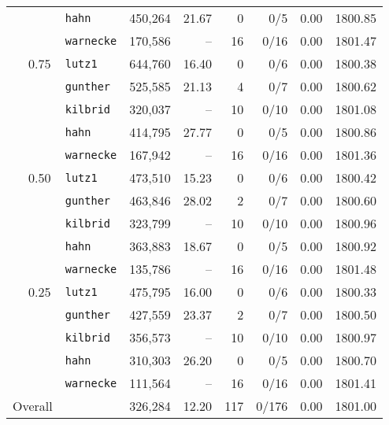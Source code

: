 \begin{table}[tpb]
\begin{tabular}{cclrrrrrr}
		&		& {\tt hahn}	& 450,264 & 21.67 & 0 & 0/5 & 0.00 & 1800.85 \\
		&		& {\tt warnecke}	& 170,586 & -- & 16 & 0/16 & 0.00 & 1801.47 \\
		& 0.75	& {\tt lutz1}	& 644,760 & 16.40 & 0 & 0/6 & 0.00 & 1800.38 \\
		&		& {\tt gunther}	& 525,585 & 21.13 & 4 & 0/7 & 0.00 & 1800.62 \\
		&		& {\tt kilbrid}	& 320,037 & -- & 10 & 0/10 & 0.00 & 1801.08 \\
		&		& {\tt hahn}	& 414,795 & 27.77 & 0 & 0/5 & 0.00 & 1800.86 \\
		&		& {\tt warnecke}	& 167,942 & -- & 16 & 0/16 & 0.00 & 1801.36 \\
		& 0.50	& {\tt lutz1}	& 473,510 & 15.23 & 0 & 0/6 & 0.00 & 1800.42 \\
		&		& {\tt gunther}	& 463,846 & 28.02 & 2 & 0/7 & 0.00 & 1800.60 \\
		&		& {\tt kilbrid}	& 323,799 & -- & 10 & 0/10 & 0.00 & 1800.96 \\
		&		& {\tt hahn}	& 363,883 & 18.67 & 0 & 0/5 & 0.00 & 1800.92 \\
		&		& {\tt warnecke}	& 135,786 & -- & 16 & 0/16 & 0.00 & 1801.48 \\
		& 0.25	& {\tt lutz1}	& 475,795 & 16.00 & 0 & 0/6 & 0.00 & 1800.33 \\
		&		& {\tt gunther}	& 427,559 & 23.37 & 2 & 0/7 & 0.00 & 1800.50 \\
		&		& {\tt kilbrid}	& 356,573 & -- & 10 & 0/10 & 0.00 & 1800.97 \\
		&		& {\tt hahn}	& 310,303 & 26.20 & 0 & 0/5 & 0.00 & 1800.70 \\
		&		& {\tt warnecke}	& 111,564 & -- & 16 & 0/16 & 0.00 & 1801.41 \\[1mm]
		\multicolumn{2}{l}{Overall} & & 326,284 & 12.20 & 117 & 0/176 & 0.00 & 1801.00 \\
		\bottomrule
	\end{tabular}
	\label{tab:appen:mipSCBF}
\end{table}
